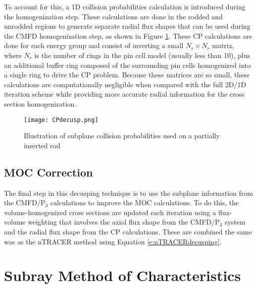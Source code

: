 To account for this, a 1D collision probabilities calculation is introduced during the homogenization step.  These calculations are done in the rodded and unrodded regions to generate separate radial flux shapes that can be used during the CMFD homogenization step, as shown in Figure \ref{f:SCPdecusping}.  These CP calculations are done for each energy group and consist of inverting a small $N_r \times N_r$ matrix, where $N_r$ is the number of rings in the pin cell model (usually less than 10), plus an additional buffer ring composed of the surrounding pin cells homogenized into a single ring to drive the CP problem.  Because these matrices are so small, these calculations are computationally negligible when compared with the full 2D/1D iteration scheme while providing more accurate radial information for the cross section homogenization.

\begin{figure}
    \centering
    \texttt{[image: CPdecusp.png]}
    \caption[Subplane Collision Probabilities Illustration]{Illustration of subplane collision probabilities used on a partially inserted rod}\label{f:SCPdecusping}
\end{figure}

\subsection{MOC Correction}

The final step in this decusping technique is to use the subplane information from the CMFD/P$_3$ calculations to improve the MOC calculations.  To do this, the volume-homogenized cross sections are updated each iteration using a flux-volume weighting that involves the axial flux shape from the CMFD/P$_3$ system and the radial flux shape from the CP calculations.  These are combined the same was as the nTRACER method using Equation \ref{e:nTRACERdecusping}.

\section{Subray Method of Characteristics}

